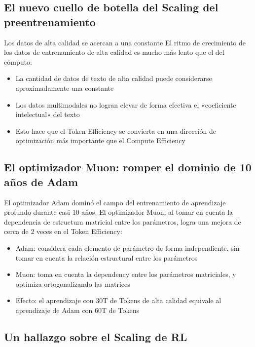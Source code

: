 \documentclass[a4paper]{article}
\begin{document}
\subsection{El nuevo cuello de botella del Scaling del preentrenamiento}

\begin{warningbox}{Los datos de alta calidad se acercan a una constante}
El ritmo de crecimiento de los datos de entrenamiento de alta calidad es mucho más lento que el del cómputo:
\begin{itemize}
    \item La cantidad de datos de texto de alta calidad puede considerarse aproximadamente una constante
    \item Los datos multimodales no logran elevar de forma efectiva el «coeficiente intelectual» del texto
    \item Esto hace que el Token Efficiency se convierta en una dirección de optimización más importante que el Compute Efficiency
\end{itemize}
\end{warningbox}

\subsection{El optimizador Muon: romper el dominio de 10 años de Adam}

El optimizador Adam dominó el campo del entrenamiento de aprendizaje profundo durante casi 10 años. El optimizador Muon, al tomar en cuenta la dependencia de estructura matricial entre los parámetros, logra una mejora de cerca de 2 veces en el Token Efficiency:

\begin{itemize}
    \item Adam: considera cada elemento de parámetro de forma independiente, sin tomar en cuenta la relación estructural entre los parámetros
    \item Muon: toma en cuenta la dependency entre los parámetros matriciales, y optimiza ortogonalizando las matrices
    \item Efecto: el aprendizaje con 30T de Tokens de alta calidad equivale al aprendizaje de Adam con 60T de Tokens
\end{itemize}

\subsection{Un hallazgo sobre el Scaling de RL}
\end{document}
